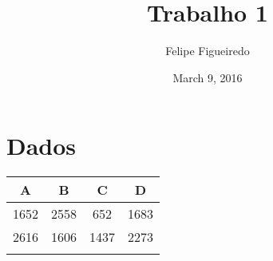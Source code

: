 \documentclass[]{article}
\title{Trabalho 1}
\author{Felipe Figueiredo}
\date{March 9, 2016}
\begin{document}
\maketitle


\section{Dados}\label{dados}

\begin{longtable}[c]{@{}cccc@{}}
\toprule
\begin{minipage}[b]{0.06\columnwidth}\centering\strut
A
\strut\end{minipage} &
\begin{minipage}[b]{0.06\columnwidth}\centering\strut
B
\strut\end{minipage} &
\begin{minipage}[b]{0.06\columnwidth}\centering\strut
C
\strut\end{minipage} &
\begin{minipage}[b]{0.06\columnwidth}\centering\strut
D
\strut\end{minipage}\tabularnewline
\midrule
\endhead
\begin{minipage}[t]{0.06\columnwidth}\centering\strut
1652
\strut\end{minipage} &
\begin{minipage}[t]{0.06\columnwidth}\centering\strut
2558
\strut\end{minipage} &
\begin{minipage}[t]{0.06\columnwidth}\centering\strut
652
\strut\end{minipage} &
\begin{minipage}[t]{0.06\columnwidth}\centering\strut
1683
\strut\end{minipage}\tabularnewline
\begin{minipage}[t]{0.06\columnwidth}\centering\strut
2616
\strut\end{minipage} &
\begin{minipage}[t]{0.06\columnwidth}\centering\strut
1606
\strut\end{minipage} &
\begin{minipage}[t]{0.06\columnwidth}\centering\strut
1437
\strut\end{minipage} &
\begin{minipage}[t]{0.06\columnwidth}\centering\strut
2273
\strut\end{minipage}\tabularnewline
\begin{minipage}[t]{0.06\columnwidth}\centering\strut

\end{minipage}
\end{longtable}
\end{document}
